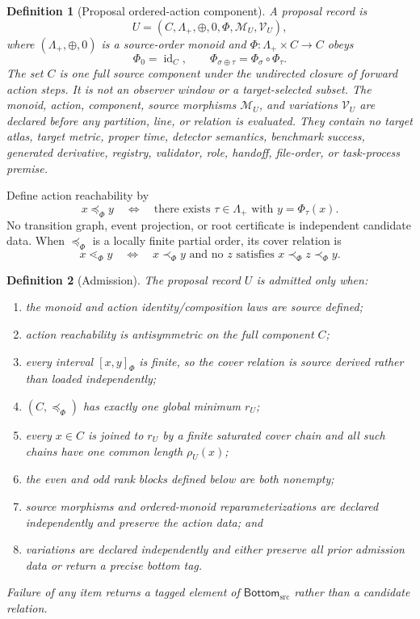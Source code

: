 \documentclass[11pt]{article}
\newtheorem{definition}{Definition}
\newcommand{\Bottom}{\mathsf{Bottom}_{\mathrm{src}}}
\begin{document}
\begin{definition}[Proposal ordered-action component]
A proposal record is
\[
 U=(C,\Lambda_+,\oplus,0,\Phi,\mathcal M_U,\mathcal V_U),
\]
where \((\Lambda_+,\oplus,0)\) is a source-order monoid and
\(\Phi:\Lambda_+\times C\to C\) obeys
\[
 \Phi_0=\operatorname{id}_C,
 \qquad
 \Phi_{\sigma\oplus\tau}=\Phi_\sigma\circ\Phi_\tau.
\]
The set \(C\) is one full source component under the undirected closure of
forward action steps. It is not an observer window or a target-selected
subset. The monoid, action, component, source morphisms \(\mathcal M_U\), and
variations \(\mathcal V_U\) are declared before any partition, line, or
relation is evaluated. They contain no target atlas, target metric, proper
time, detector semantics, benchmark success, generated derivative, registry,
validator, role, handoff, file-order, or task-process premise.
\end{definition}

Define action reachability by
\[
 x\preceq_\Phi y
 \quad\Longleftrightarrow\quad
 \text{there exists }\tau\in\Lambda_+\text{ with }y=\Phi_\tau(x).
\]
No transition graph, event projection, or root certificate is independent
candidate data. When \(\preceq_\Phi\) is a locally finite partial order, its
cover relation is
\[
 x\lessdot_\Phi y
 \quad\Longleftrightarrow\quad
 x\prec_\Phi y\text{ and no }z\text{ satisfies }x\prec_\Phi z\prec_\Phi y.
\]

\begin{definition}[Admission]
The proposal record \(U\) is admitted only when:
\begin{enumerate}[label=(A\arabic*)]
  \item the monoid and action identity/composition laws are source defined;
  \item action reachability is antisymmetric on the full component \(C\);
  \item every interval \([x,y]_\Phi\) is finite, so the cover relation is
  source derived rather than loaded independently;
  \item \((C,\preceq_\Phi)\) has exactly one global minimum \(r_U\);
  \item every \(x\in C\) is joined to \(r_U\) by a finite saturated cover
  chain and all such chains have one common length \(\rho_U(x)\);
  \item the even and odd rank blocks defined below are both nonempty;
  \item source morphisms and ordered-monoid reparameterizations are declared
  independently and preserve the action data; and
  \item variations are declared independently and either preserve all prior
  admission data or return a precise bottom tag.
\end{enumerate}
Failure of any item returns a tagged element of \(\Bottom\) rather than a
candidate relation.
\end{definition}
\end{document}
